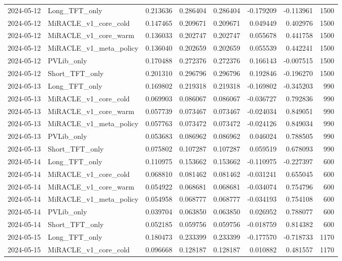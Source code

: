 \begin{tabular}{llrrrrrr}
2024-05-12 & Long_TFT_only & 0.213636 & 0.286404 & 0.286404 & -0.179209 & -0.113961 & 1500 \\
2024-05-12 & MiRACLE_v1_core_cold & 0.147465 & 0.209671 & 0.209671 & 0.049449 & 0.402976 & 1500 \\
2024-05-12 & MiRACLE_v1_core_warm & 0.136033 & 0.202747 & 0.202747 & 0.055678 & 0.441758 & 1500 \\
2024-05-12 & MiRACLE_v1_meta_policy & 0.136040 & 0.202659 & 0.202659 & 0.055539 & 0.442241 & 1500 \\
2024-05-12 & PVLib_only & 0.170488 & 0.272376 & 0.272376 & 0.166143 & -0.007515 & 1500 \\
2024-05-12 & Short_TFT_only & 0.201310 & 0.296796 & 0.296796 & 0.192846 & -0.196270 & 1500 \\
2024-05-13 & Long_TFT_only & 0.169802 & 0.219318 & 0.219318 & -0.169802 & -0.345203 & 990 \\
2024-05-13 & MiRACLE_v1_core_cold & 0.069903 & 0.086067 & 0.086067 & -0.036727 & 0.792836 & 990 \\
2024-05-13 & MiRACLE_v1_core_warm & 0.057739 & 0.073467 & 0.073467 & -0.024034 & 0.849051 & 990 \\
2024-05-13 & MiRACLE_v1_meta_policy & 0.057763 & 0.073472 & 0.073472 & -0.024126 & 0.849034 & 990 \\
2024-05-13 & PVLib_only & 0.053683 & 0.086962 & 0.086962 & 0.046024 & 0.788505 & 990 \\
2024-05-13 & Short_TFT_only & 0.075802 & 0.107287 & 0.107287 & 0.059519 & 0.678093 & 990 \\
2024-05-14 & Long_TFT_only & 0.110975 & 0.153662 & 0.153662 & -0.110975 & -0.227397 & 600 \\
2024-05-14 & MiRACLE_v1_core_cold & 0.068810 & 0.081462 & 0.081462 & -0.031241 & 0.655045 & 600 \\
2024-05-14 & MiRACLE_v1_core_warm & 0.054922 & 0.068681 & 0.068681 & -0.034074 & 0.754796 & 600 \\
2024-05-14 & MiRACLE_v1_meta_policy & 0.054958 & 0.068777 & 0.068777 & -0.034193 & 0.754108 & 600 \\
2024-05-14 & PVLib_only & 0.039704 & 0.063850 & 0.063850 & 0.026952 & 0.788077 & 600 \\
2024-05-14 & Short_TFT_only & 0.052185 & 0.059756 & 0.059756 & -0.018759 & 0.814382 & 600 \\
2024-05-15 & Long_TFT_only & 0.180473 & 0.233399 & 0.233399 & -0.177570 & -0.718733 & 1170 \\
2024-05-15 & MiRACLE_v1_core_cold & 0.096668 & 0.128187 & 0.128187 & 0.010882 & 0.481557 & 1170 \\

\end{tabular}
